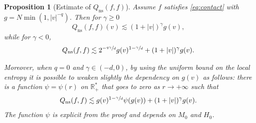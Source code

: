 \documentclass[JEP,XML,SOM,Unicode,NoFloatCountersInSection]{cedram}
\newcommand{\ns}{\mathrm{ns}}
\theoremstyle{plain}
\newtheorem{prop}[thm]{Proposition}
\theoremstyle{definition}
\numberwithin{equation}{section}
\newcommand{\R}{\mathbb R}
\let\A N
\begin{document}
\skpt
\begin{prop}[Estimate of $Q_{\ns}(f,f)$] \label{prop:Q2} Assume $f$
satisfies \eqref{eq:contact} with $g = \A \min(1,|v|^{-q})$. Then
for $\gamma \ge 0$
\[ Q_{\ns}(f,f)(v) \lesssim (1+|v|)^{\gamma} g(v), \]
while for $\gamma <0$,
\[
Q_{\ns}(f,f) \lesssim 2^{-\sfrac{q\gamma}{d}} g(v)^{1-\sfrac{\gamma}{d}} +
(1+|v|)^\gamma g(v).
\]

Moreover, when $q=0$ and $\gamma\in (-d,0)$, by using the uniform bound
on the local entropy it is possible to weaken slightly the dependency
on $g(v)$ as follows: there is a function $\psi =\psi(r)$ on $\R_+^*$
that goes to zero as $r \to +\infty$ such that
\begin{equation}
\label{eq:Qnslog}
Q_{\ns}(f,f) \lesssim g(v)^{1-\sfrac{\gamma}{d}} \psi(g(v))
+ (1+|v|)^\gamma g(v).
\end{equation}
The function $\psi$ is explicit from the proof and depends on $M_0$
and $H_0$.
\end{prop}
\end{document}
